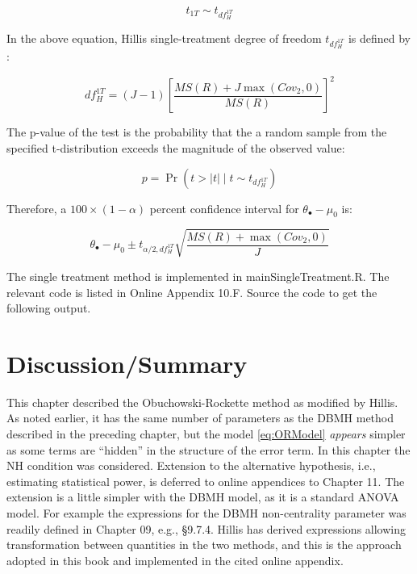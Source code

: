 \documentclass[
]{book}
\begin{document}
\begin{equation}
t_{1T} \sim t_{df_{H}^{1T}}
\label{eq:DistTStat1T}
\end{equation}

In the above equation, Hillis single-treatment degree of freedom \(t_{df_{H}^{1T}}\) is defined by \citep{RN2508}:

\begin{equation}
df_{H}^{1T}=(J-1)\left [\frac{MS(R)+J \max(Cov_2,0)}{MS(R)} \right ]^2
\label{eq:DefdfHI1}
\end{equation}

The p-value of the test is the probability that the a random sample from the specified t-distribution exceeds the magnitude of the observed value:

\begin{equation}
p=\Pr(t>\left | t \right |\mid t \sim t_{df_{H}^{1T}})
\label{eq:pValue1T}
\end{equation}

Therefore, a \(100 \times (1-\alpha)\) percent confidence interval for \(\theta_{\bullet}-\mu_0\) is:

\begin{equation}
\theta_{\bullet}-\mu_0 \pm t_{\alpha/2,df_{H}^{1T}} \sqrt{ \frac{MS(R)+\max(Cov_2,0)}{J}}
\label{eq:CIalpha1T}
\end{equation}

The single treatment method is implemented in mainSingleTreatment.R. The relevant code is listed in Online Appendix 10.F. Source the code to get the following output.

\hypertarget{discussionsummary}{%
\section{Discussion/Summary}\label{discussionsummary}}

This chapter described the Obuchowski-Rockette method as modified by Hillis. As noted earlier, it has the same number of parameters as the DBMH method described in the preceding chapter, but the model \eqref{eq:ORModel} \emph{appears} simpler as some terms are ``hidden'' in the structure of the error term. In this chapter the NH condition was considered. Extension to the alternative hypothesis, i.e., estimating statistical power, is deferred to online appendices to Chapter 11. The extension is a little simpler with the DBMH model, as it is a standard ANOVA model. For example the expressions for the DBMH non-centrality parameter was readily defined in Chapter 09, e.g., §9.7.4. Hillis has derived expressions allowing transformation between quantities in the two methods, and this is the approach adopted in this book and implemented in the cited online appendix.
\end{document}
